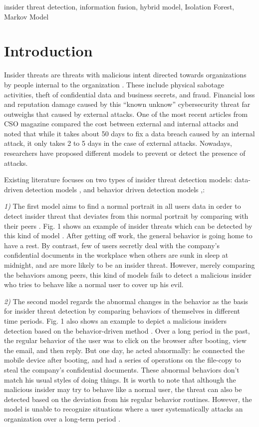 \documentclass[conference]{IEEEtran}
\begin{document}
\begin{IEEEkeywords}
insider threat detection, information fusion, hybrid model, Isolation Forest, Markov Model
\end{IEEEkeywords}

\section{Introduction}

Insider threats are threats with malicious intent directed towards organizations by people internal to the organization \cite{b1}.
These include physical sabotage activities, theft of confidential data and business secrets, and fraud. Financial loss and reputation damage caused by this ``known unknow'' cybersecurity threat far outweighs that caused by external attacks. One of the most recent articles from CSO magazine \cite{b2} compared the cost between external and internal attacks and noted that while it takes about 50 days to fix a data breach caused by an internal attack, it only takes 2 to 5 days in the case of external attacks. Nowadays, researchers have proposed different models to prevent or detect the presence of attacks.

Existing literature focuses on two types of insider threat detection 
models: data-driven detection models \cite{b3},\cite{b4} and behavior driven detection models \cite{b5},\cite{b6}: 

\noindent \emph{1)} The first model aims to find a normal portrait in all users data in order to detect insider threat that deviates from this normal portrait by comparing with their peers \cite{b7}. Fig. 1 shows an example of insider threats which can be detected by this kind of model \cite{b7}. After getting off work, the general behavior is going home to have a rest. By contrast, few of users secretly deal with the company's confidential documents in the workplace when others are sunk in sleep at midnight, and are more likely to be an insider threat. However, merely comparing the behaviors among peers,  this kind of models fails to detect a malicious insider who tries to behave like a normal user to cover up his evil.

\noindent \emph{2)} The second model regards the abnormal changes in the behavior as the basis for insider threat detection by comparing behaviors of themselves in different time periods.
Fig. 1 also shows an example to depict a malicious insiders detection based on the behavior-driven method \cite{b8}. Over a long period in the past, the regular behavior of the user was to click on the browser after booting, view the email, and then reply. But one day, he acted abnormally: he connected the mobile device after booting, and had a series of operations on the file-copy to steal the company's confidential documents. These abnormal behaviors don't match his usual styles of doing things. It is worth to note that although the malicious insider may try to behave like a normal user, the threat can also be detected based on the deviation from his regular behavior routines.
However, the model is unable to recognize situations where a user systematically attacks an
organization over a long-term period \cite{b3}. 
\end{document}
